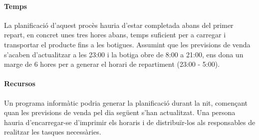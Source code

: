 \paragraph{Temps} La planificació d'aquest procès hauria d'estar completada abans del primer repart, en concret unes tres hores abans, temps suficient per a carregar i transportar el producte fins a les botigues. Assumint que les previsions de venda s'acaben d'actualitzar a les 23:00 i la botiga obre de 8:00 a 21:00, ens dona un marge de 6 hores per a generar el horari de repartiment (23:00 - 5:00).

\paragraph{Recursos} Un programa informàtic podria generar la planificació durant la nit, començant quan les previsions de venda pel dia següent s'han actualitzat. Una persona hauria d'encarregar-se d'imprimir els horaris i de distribuïr-los als responsables de realitzar les tasques necessàries.
